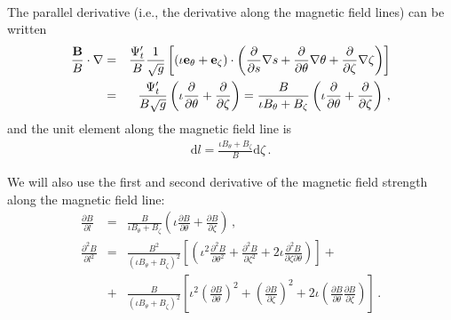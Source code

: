 \

The parallel derivative (i.e., the derivative along the magnetic field lines) can be written
\begin{eqnarray}
\frac{\mathbf{B}}{B}\cdot\nabla &=& \frac{\Psi_t'}{B}\frac{1}{\sqrt{g}}\left[(\iota\mathbf{e}_\theta + \mathbf{e}_\zeta)\cdot\left(\frac{\partial}{\partial s}\mathbf{\nabla} s+\frac{\partial}{\partial \theta}\mathbf{\nabla}\theta+\frac{\partial}{\partial \zeta}\mathbf{\nabla}\zeta\right)\right]\nonumber\\  &=&  \frac{\Psi_t'}{B\sqrt{g}}\left(\iota\frac{\partial}{\partial \theta} +\frac{\partial}{\partial \zeta}\right) = \frac{B}{\iota B_\theta+B_\zeta}\left(\iota\frac{\partial}{\partial \theta} +\frac{\partial}{\partial \zeta}\right) \,,
\end{eqnarray}
and the unit element along the magnetic field line is
\begin{eqnarray}
\mathrm{d}l=\frac{\iota B_\theta+B_\zeta}{B}\mathrm{d}\zeta \,.
\end{eqnarray}

We will also use the first and second derivative of the magnetic field strength along the magnetic field line:
\begin{eqnarray}
\frac{\partial B}{\partial l} &=& \frac{B}{\iota B_\theta+B_\zeta}\left(\iota\frac{\partial B}{\partial \theta} +\frac{\partial B}{\partial \zeta}\right)\,,\nonumber\\
\frac{\partial^2 B}{\partial l^2} &=& \frac{B^2}{(\iota B_\theta+B_\zeta)^2}\left[\left(\iota^2\frac{\partial^2 B}{\partial \theta^2}+\frac{\partial^2 B}{\partial \zeta^2}+2\iota\frac{\partial^2 B}{\partial \zeta\partial\theta}\right)\right] +\nonumber\\
 &+&\frac{B}{(\iota B_\theta+B_\zeta)^2}\left[\iota^2\left(\frac{\partial B}{\partial \theta}\right)^2+\left(\frac{\partial B}{\partial \zeta}\right)^2+2\iota\left(\frac{\partial B}{\partial \theta}\frac{\partial B}{\partial \zeta}\right)\right]\,.
\end{eqnarray}

